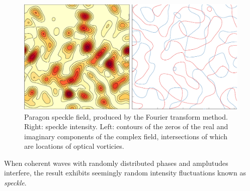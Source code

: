 \begin{figure}[ht]
\centering
\includegraphics[keepaspectratio,width=15cm]{speckle/figures/introfig.pdf}
\caption{Paragon speckle field, produced by the Fourier transform method.
								Right: speckle intensity.  Left: contours of the zeros of the real
								and imaginary components of the complex field, intersections of
								which are locations of optical vorticies.}
\end{figure}

When coherent waves with randomly distributed phases and amplutudes
interfere, the result exhibits seemingly random intensity fluctuations
known as \textit{speckle}.  

